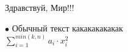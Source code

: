 \documentclass[12pt,a4paper]{scrartcl}
\begin{document}
\begin{center}	
Здравствуй, Мир!!!
\end{center}
$\bullet${ Обычный текст}
какакакакакак \\
$\sum\limits_{i=1}^{min(k, n)} a_i\cdot x_i^2$
\end{document}
